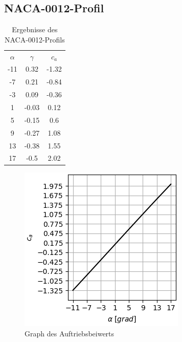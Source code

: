 \newpage
\subsection{NACA-0012-Profil} 
\begin{minipage}{0.45\textwidth}
\begin{table}[H]
    \centering
    \begin{tabular}{c|cc}
    $\alpha$ & $\gamma$ & $c_a$ \\
        -11 & 0.32 & -1.32 \\ 
-7 & 0.21 & -0.84 \\ 
-3 & 0.09 & -0.36 \\ 
1 & -0.03 & 0.12 \\ 
5 & -0.15 & 0.6 \\ 
9 & -0.27 & 1.08 \\ 
13 & -0.38 & 1.55 \\ 
17 & -0.5 & 2.02 \\ 

    \end{tabular}
    \label{tab:naca}
    \caption{Ergebnisse des NACA-0012-Profils}
\end{table}
\end{minipage}
\hfill
\begin{minipage}{0.45\textwidth}
\begin{figure}[H]
    \centering
    \includegraphics[scale=0.6]{figures/nacaca.png}
    \caption{Graph des Auftriebsbeiwerts}
    \label{fig:nacaca}
\end{figure}
\end{minipage}

